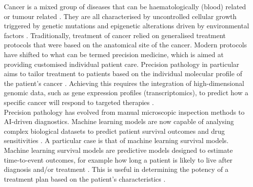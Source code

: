 \label{ssub:cancer}

Cancer is a mixed group of diseases that can be haematologically (blood) related or tumour related
\cite{NCI}. They are all characterised by uncontrolled cellular growth triggered by genetic
mutations and epigenetic alterations driven by environmental factors \cite{NCI}. Traditionally,
treatment of cancer relied on generalised treatment protocols that were based on the anatomical site
of the cancer. Modern protocols have shifted to what can be termed precision medicine, which is aimed
at providing customised individual patient care. Precision pathology in particular aims to tailor
treatment to patients based on the individual molecular profile of the patient's cancer
\cite{Klauschen2024}. Achieving this requires the integration of high-dimensional genomic data, such
as gene expression profiles (transcriptomics), to predict how a specific cancer will respond to
targeted therapies \cite{Klauschen2024}.
\\
Precision pathology has evolved from manual microscopic inspection methods to AI-driven diagnostics.
Machine learning models are now capable of analysing complex biological datasets to predict patient
survival outcomes and drug sensitivities \cite{Kovalev2021}. A particular case is that of machine
learning survival models. Machine learning survival models are predictive models designed to estimate
time-to-event outcomes, for example how long a patient is likely to live after diagnosis and/or
treatment \cite{Kovalev2021}. This is useful in determining the potency of a treatment plan based on
the patient's characteristics \cite{Kovalev2021}.

